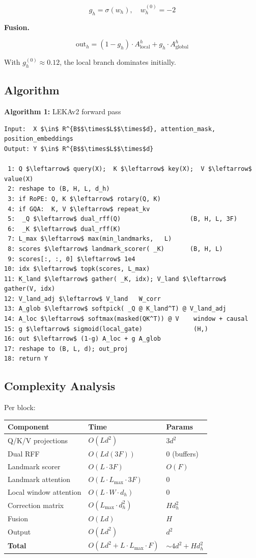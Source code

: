 \[
g_h = \sigma(w_h), \quad w_h^{(0)} = -2
\tag{4.13}
\]

\textbf{Fusion.}

\[
\text{out}_h = (1 - g_h) \cdot A_\text{local}^h + g_h \cdot A_\text{global}^h
\tag{4.14}
\]

With $g_h^{(0)} \approx 0.12$, the local branch dominates initially.

\subsection{Algorithm}

\textbf{Algorithm 1:} LEKAv2 forward pass
\begin{lstlisting}
Input:  X $\in$ R^{B$$\times$L$$\times$d}, attention_mask, position_embeddings
Output: Y $\in$ R^{B$$\times$L$$\times$d}

 1: Q $\leftarrow$ query(X);  K $\leftarrow$ key(X);  V $\leftarrow$ value(X)
 2: reshape to (B, H, L, d_h)
 3: if RoPE: Q, K $\leftarrow$ rotary(Q, K)
 4: if GQA:  K, V $\leftarrow$ repeat_kv
 5:  _Q $\leftarrow$ dual_rff(Q)                   (B, H, L, 3F)
 6:  _K $\leftarrow$ dual_rff(K)
 7: L_max $\leftarrow$ max(min_landmarks,   L)
 8: scores $\leftarrow$ landmark_scorer( _K)       (B, H, L)
 9: scores[:, :, 0] $\leftarrow$ 1e4
10: idx $\leftarrow$ topk(scores, L_max)
11: K_land $\leftarrow$ gather( _K, idx); V_land $\leftarrow$ gather(V, idx)
12: V_land_adj $\leftarrow$ V_land   W_corr
13: A_glob $\leftarrow$ softpick( _Q @ K_land^T) @ V_land_adj
14: A_loc $\leftarrow$ softmax(masked(QK^T)) @ V    window + causal
15: g $\leftarrow$ sigmoid(local_gate)              (H,)
16: out $\leftarrow$ (1-g) A_loc + g A_glob
17: reshape to (B, L, d); out_proj
18: return Y
\end{lstlisting}

\subsection{Complexity Analysis}

Per block:

\begin{table}[H]
\centering
\small
\begin{tabular}{lll}
\toprule
\textbf{Component} & \textbf{Time} & \textbf{Params} \\
\midrule
Q/K/V projections & $O(L d^2)$ & $3 d^2$ \\
Dual RFF & $O(L d (3F))$ & 0 (buffers) \\
Landmark scorer & $O(L \cdot 3F)$ & $O(F)$ \\
Landmark attention & $O(L \cdot L_\text{max} \cdot 3F)$ & 0 \\
Local window attention & $O(L \cdot W \cdot d_h)$ & 0 \\
Correction matrix & $O(L_\text{max} \cdot d_h^2)$ & $H d_h^2$ \\
Fusion & $O(L d)$ & $H$ \\
Output & $O(L d^2)$ & $d^2$ \\
\textbf{Total} & $O(L d^2 + L \cdot L_\text{max} \cdot F)$ & $\sim 4 d^2 + H d_h^2$ \\
\bottomrule
\end{tabular}
\end{table}

